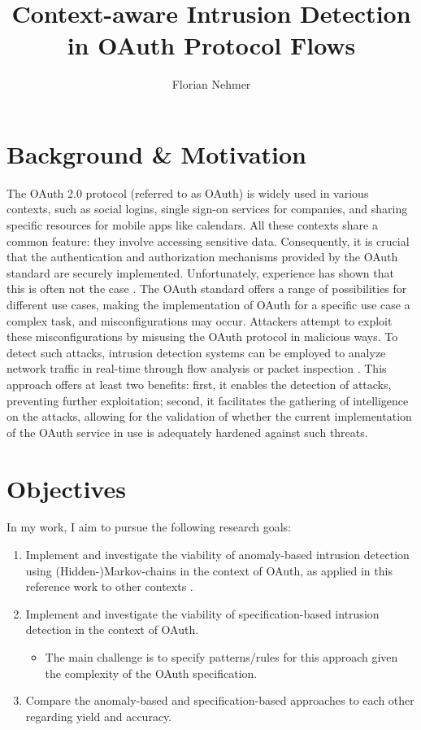 \documentclass{article}
\title{Context-aware Intrusion Detection in OAuth Protocol Flows}
\author{Florian Nehmer}
\begin{document}
\maketitle

\section{Background \& Motivation}
The OAuth 2.0 protocol \cite{rfc6749} (referred to as OAuth) is widely used in various contexts, such as social logins, single sign-on services for companies, and sharing specific resources for mobile apps like calendars. All these contexts share a common feature: they involve accessing sensitive data. Consequently, it is crucial that the authentication and authorization mechanisms provided by the OAuth standard are securely implemented. Unfortunately, experience has shown that this is often not the case \cite{Li2019}. The OAuth standard offers a range of possibilities for different use cases, making the implementation of OAuth for a specific use case a complex task, and misconfigurations may occur. Attackers attempt to exploit these misconfigurations by misusing the OAuth protocol in malicious ways. To detect such attacks, intrusion detection systems can be employed to analyze network traffic in real-time through flow analysis or packet inspection \cite{Liu2019}. This approach offers at least two benefits: first, it enables the detection of attacks, preventing further exploitation; second, it facilitates the gathering of intelligence on the attacks, allowing for the validation of whether the current implementation of the OAuth service in use is adequately hardened against such threats.

\section{Objectives}
In my work, I aim to pursue the following research goals:

\begin{enumerate}
    \item Implement and investigate the viability of anomaly-based intrusion detection using (Hidden-)Markov-chains in the context of OAuth, as applied in this reference work to other contexts \cite{sperotto2011}.
    \item Implement and investigate the viability of specification-based intrusion detection in the context of OAuth.
    \begin{itemize}
        \item The main challenge is to specify patterns/rules for this approach given the complexity of the OAuth specification.
    \end{itemize}
    \item Compare the anomaly-based and specification-based approaches to each other regarding yield and accuracy.
\end{enumerate}
\end{document}
